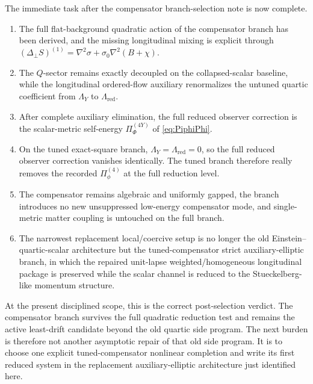 \documentclass[11pt]{article}
\begin{document}
The immediate task after the compensator branch-selection note is now complete.
\begin{enumerate}
    \item The full flat-background quadratic action of the compensator branch has been derived, and the missing longitudinal mixing is explicit through \((\Delta_\perp S)^{(1)}=\nabla^2\sigma+\sigma_0\nabla^2(B+\chi)\).
    \item The \(Q\)-sector remains exactly decoupled on the collapsed-scalar baseline, while the longitudinal ordered-flow auxiliary renormalizes the untuned quartic coefficient from \(\Lambda_Y\) to \(\Lambda_{\mathrm{red}}\).
    \item After complete auxiliary elimination, the full reduced observer correction is the scalar-metric self-energy \(\Pi_{\Phi}^{(4Y)}\) of \eqref{eq:PiphiPhi}.
    \item On the tuned exact-square branch, \(\Lambda_Y=\Lambda_{\mathrm{red}}=0\), so the full reduced observer correction vanishes identically. The tuned branch therefore really removes the recorded \(\Pi_\phi^{(4)}\) at the full reduction level.
    \item The compensator remains algebraic and uniformly gapped, the branch introduces no new unsuppressed low-energy compensator mode, and single-metric matter coupling is untouched on the full branch.
    \item The narrowest replacement local/coercive setup is no longer the old Einstein--quartic-scalar architecture but the tuned-compensator strict auxiliary-elliptic branch, in which the repaired unit-lapse weighted/homogeneous longitudinal package is preserved while the scalar channel is reduced to the Stueckelberg-like momentum structure.
\end{enumerate}

At the present disciplined scope, this is the correct post-selection verdict. The compensator branch survives the full quadratic reduction test and remains the active least-drift candidate beyond the old quartic side program. The next burden is therefore not another asymptotic repair of that old side program. It is to choose one explicit tuned-compensator nonlinear completion and write its first reduced system in the replacement auxiliary-elliptic architecture just identified here.
\end{document}
